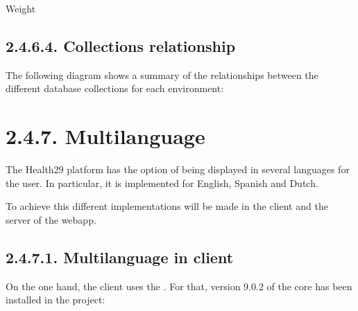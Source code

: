 \documentclass[letterpaper,10pt,english]{sphinxmanual}
\begin{document}
Weight

\begin{sphinxVerbatim}[commandchars=\\\{\}]
   
	    
	 
	     
 
                 
\end{sphinxVerbatim}


\subsection{2.4.6.4. Collections relationship}
\label{\detokenize{pages/SW/Code:collections-relationship}}
The following diagram shows a summary of the relationships between the different database collections for each environment:




\section{2.4.7. Multilanguage}
\label{\detokenize{pages/SW/Code:multilanguage}}
The Health29 platform has the option of being displayed in several languages for the user. In particular, it is implemented for English, Spanish and Dutch.

To achieve this different implementations will be made in the client and the server of the webapp.


\subsection{2.4.7.1. Multilanguage in client}
\label{\detokenize{pages/SW/Code:multilanguage-in-client}}
On the one hand, the client uses the .
For that, version 9.0.2 of the core has been installed in the project:
\end{document}
